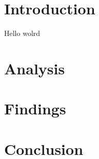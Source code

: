 \documentclass[cm, 10pt]{article}
\begin{document}
  \section{Introduction}
    Hello wolrd


  \section{Analysis}


  \section{Findings}


  \section{Conclusion}

\end{document}

